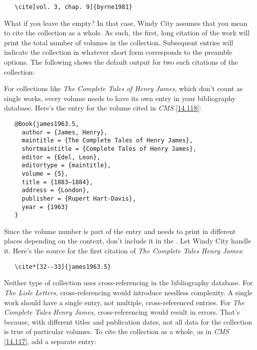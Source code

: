 \documentclass[11pt,letterpaper,oneside]{article}
\begin{document}
\begin{verbatim}
   \cite[vol. 3, chap. 9]{byrne1981}
\end{verbatim}

What if you leave the  empty? In that case, Windy
City assumes that you mean to cite the collection as a whole. As such,
the first, long citation of the work will print the total number of
volumes in the collection. Subsequent entries will indicate the
collection in whatever short form corresponds to the preamble options.
The following shows the default output for two such citations of the
collection:

\begin{citeonly}
\item \cite{byrne1981}
\item \cite{byrne1981}
\end{citeonly}

For collections like \textit{The Complete Tales of Henry James}, which
don't count as single works, every volume needs to have its own entry
in your bibliography database. Here's the entry for the volume cited
in \textit{CMS} \ref{14.118}:

\begin{verbatim}
   @Book{james1963.5,
     author = {James, Henry},
     maintitle = {The Complete Tales of Henry James},
     shortmaintitle = {Complete Tales of Henry James},
     editor = {Edel, Leon},
     editortype = {maintitle},
     volume = {5},
     title = {1883–1884},
     address = {London},
     publisher = {Rupert Hart-Davis},
     year = {1963}
   }
\end{verbatim}

Since the volume number is part of the entry and needs to print in
different places depending on the context, don't include it in the
. Let Windy City handle it. Here's the source for
the first citation of \textit{The Complete Tales Henry James}:

\begin{verbatim}
   \cite*[32--33]{james1963.5}
\end{verbatim}

Neither type of collection uses cross-referencing in the bibliography
database. For \textit{The Lisle Letters}, cross-referencing would
introduce needless complexity. A single work should have a single
entry, not multiple, cross-referenced entries. For \textit{The
Complete Tales Henry James}, cross-referencing would result in errors.
That's because, with different titles and publication dates, not all
data for the collection is true of particular volumes. To cite the
collection as a whole, as in \textit{CMS} \ref{14.117}, add a separate
entry:
\end{document}
